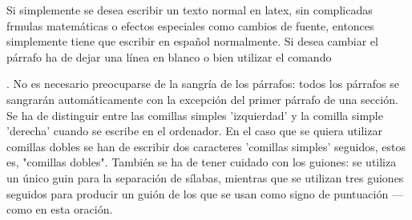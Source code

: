 \documentclass[a4paper,10pt]{letter}
\begin{document}
Si simplemente se desea escribir un texto normal en latex,
sin complicadas frmulas matemáticas o efectos especiales
como cambios  de fuente, entonces simplemente tiene que escribir
en español normalmente.
Si desea cambiar el párrafo ha de dejar una línea en blanco o bien
utilizar el comando \par.
No es necesario preocuparse de la sangría de los párrafos:
todos los párrafos se sangrarán automáticamente con la excepción
del primer párrafo de una sección.
Se ha de distinguir entre las comillas simples 'izquierdad' 
y la comilla simple 'derecha' cuando se escribe en el ordenador.
En el caso que se quiera utilizar comillas dobles se han de
escribir dos caracteres 'comillas simples' seguidos, estos es,
"comillas dobles".
También se ha de tener cuidado con los guiones: se utiliza un único
guin para la separación de sílabas, mientras que se utilizan 
tres  guiones seguidos para producir un guión de los que se usan
como signo de puntuación --- como en esta oración.
\end{document}
